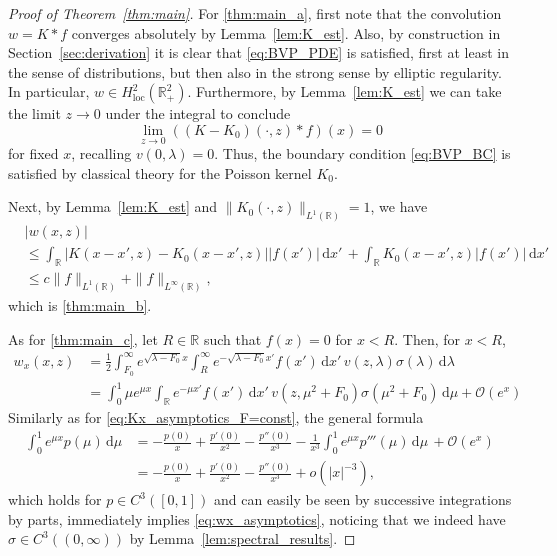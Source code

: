\documentclass[11pt,twoside,reqno,centertags]{amsart}
\theoremstyle{definition}
\newcommand{\R}{\mathbb R}
\newcommand{\dd}{\mathrm d}
\begin{document}
\begin{proof}[Proof of Theorem~\ref{thm:main}]
	For \ref{thm:main_a}, first note that the convolution $w=K\ast f$ converges absolutely by Lemma~\ref{lem:K_est}. Also, by construction in Section~\ref{sec:derivation} it is clear that \eqref{eq:BVP_PDE} is satisfied, first at least in the sense of distributions, but then also in the strong sense by elliptic regularity. In particular, $w\in H^2_{\mathrm{loc}}(\R^2_+)$. Furthermore, by Lemma~\ref{lem:K_est} we can take the limit $z\to0$ under the integral to conclude
	\[\lim_{z\to0} ((K-K_0)(\cdot,z)\ast f)(x) = 0\]
	for fixed $x$, recalling $v(0,\lambda)=0$. Thus, the boundary condition \eqref{eq:BVP_BC} is satisfied by classical theory for the Poisson kernel $K_0$.
	
	Next, by Lemma~\ref{lem:K_est} and $\|K_0(\cdot,z)\|_{L^1(\R)}=1$, we have
	\begin{align*}
		&|w(x,z)|\\
		 &\le \int_\R |K(x-x',z)-K_0(x-x',z)| |f(x')|\,\dd x'\, + \int_\R K_0(x-x',z) |f(x')|\,\dd x'\\
		&\le c\|f\|_{L^1(\R)} + \|f\|_{L^\infty(\R)},
	\end{align*}
	which is \ref{thm:main_b}.
	
	As for \ref{thm:main_c}, let $R\in\R$ such that $f(x)=0$ for $x<R$. Then, for $x<R$,
	\begin{align*}
		w_x(x,z) &= \frac12\int_{F_0}^\infty e^{\sqrt{\lambda-F_0}x} \int_R^\infty e^{-\sqrt{\lambda-F_0}x'}f(x')\,\dd x'\,v(z,\lambda)\sigma(\lambda)\,\dd\lambda \\
		&= \int_0^1 \mu e^{\mu x} \int_\R e^{-\mu x'} f(x')\,\dd x'\, v(z,\mu^2+F_0) \sigma(\mu^2+F_0)\,\dd\mu + \mathcal O(e^x)
	\end{align*}
	Similarly as for \eqref{eq:Kx_asymptotics_F=const}, the general formula
	\begin{align*}
		\int_0^1 e^{\mu x}p(\mu)\,\dd\mu &= -\frac{p(0)}{x} + \frac{p'(0)}{x^2} - \frac{p''(0)}{x^3} - \frac{1}{x^3} \int_0^1 e^{\mu x} p'''(\mu)\,\dd\mu \,+ \mathcal O(e^x) \\
		&= -\frac{p(0)}{x} + \frac{p'(0)}{x^2} - \frac{p''(0)}{x^3} + o(|x|^{-3}),
	\end{align*}
	which holds for $p\in C^3([0,1])$ and  can easily be seen by successive integrations by parts, immediately implies \eqref{eq:wx_asymptotics}, noticing that we indeed have $\sigma\in C^3((0,\infty))$ by Lemma~\ref{lem:spectral_results}.
\end{proof}
\end{document}
